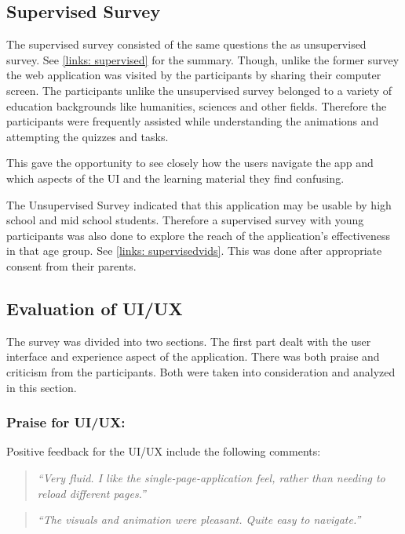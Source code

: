 \subsection{Supervised Survey}
The supervised survey consisted of the same questions the as unsupervised
survey. See \autoref{links: supervised} for the summary. Though, unlike the
former survey the web application was visited by the participants by sharing
their computer screen. The participants unlike the unsupervised survey belonged
to a variety of education backgrounds like humanities, sciences and other
fields. Therefore the participants were frequently assisted while understanding
the animations and attempting the quizzes and tasks.

This gave the opportunity to see closely how the users navigate the app and
which aspects of the UI and the learning material they find confusing.

The Unsupervised Survey indicated that this application may be usable by high
school and mid school students. Therefore a supervised survey with young
participants was also done to explore the reach of the application's
effectiveness in that age group. See \autoref{links: supervisedvids}. This was
done after appropriate consent from their parents.


\subsection{Evaluation of UI/UX}
The survey was divided into two sections. The first part dealt with the user interface
and experience aspect of the application. There was both praise and criticism
from the participants. Both were taken into consideration and analyzed
in this section.

\subsubsection{Praise for UI/UX:}
Positive feedback for the UI/UX include the following comments:

\begin{quote}
\emph{``Very fluid. I like the single-page-application feel, rather than
needing to reload different pages.''}
\end{quote}

\vspace{0.06 in}
\begin{quote}
\emph{``The visuals and animation were pleasant. Quite easy to navigate.''}
\end{quote}

